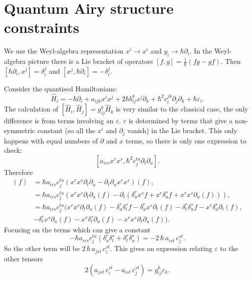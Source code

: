  \section{Quantum Airy structure constraints}
 \label{appendix:quantum_airy}
    We use the Weyl-algebra representation \(x^i \rightarrow x^i \) and \( y_i \rightarrow \hbar \partial_i \). In the Weyl-algebra picture there is a Lie bracket of operators \( [f,g] = \frac{1}{\hbar} \left( f g - g f \right) \). Then \( [ \hbar \partial_i , x^j ] = \delta_i^j \) and \( [ x^j, \hbar \partial_i ] = - \delta_i^j \).
    
    Consider the quantised Hamiltonians:
    \[ \widehat{H}_i = -\hbar \partial_i + a_{ijk} x^i x^j + 2 \hbar b_{ij}^k x^j \partial_k + \hbar^2 c_i^{jk} \partial_j \partial_k + \hbar \varepsilon_i. \]
    The calculation of \( [\widehat{H}_i,\widehat{H}_j]= g_{ij}^k \widehat{H}_k\) is very similar to the classical case, the only difference is from terms involving an \( \varepsilon \). \( \varepsilon \) is determined by terms that give a non-symmetric constant (so all the \(x^i\) and \( \partial_j\) vanish) in the Lie bracket. This only happens with equal numbers of \( \partial \) and \( x\) terms, so there is only one expression to check:
    \[  [ a_{irs} x^r x^s ,   \hbar^2 c_j^{tu} \partial_t \partial_u ]. \]
    Therefore
    \begin{align*}
          [ a_{irs} x^r x^s ,   \hbar^2 c_j^{tu} \partial_t \partial_u ] (f) &=  \hbar a_{irs} c_j^{tu} \left( x^r x^s \partial_t \partial_u - \partial_t \partial_u x^r x^s \right)(f), \\
                                                                             &= \hbar a_{irs} c_j^{tu} \left( x^r x^s \partial_t \partial_u (f) - \partial_t ( \delta_u^r x^s f + x^r \delta_u^s f + x^r x^s \partial_u (f)  ) \right),\\
                                                                            &= \hbar a_{irs} c_j^{tu} \big( x^r x^s \partial_t \partial_u (f) - \delta_u^r \delta_t^s f - \delta_u^r x^s \partial_t (f)  - \delta^r_t \delta_u^s f - x^r \delta_u^s \partial_t(f), \\
                                                                            &- \delta_t^r x^s \partial_u (f)  - x^r \delta^s_t \partial_u (f) - x^r x^s \partial_t \partial_u (f) \big).
    \end{align*}
    Focusing on the terms which can give a constant 
    \[ -\hbar  a_{irs} c_j^{tu} \left( \delta_u^r \delta_t^s  + \delta^r_t \delta_u^s \right) = -2 \, \hbar \,  a_{ist} \, c_j^{st}. \]
    So the other term will be \( 2 \, \hbar \,  a_{jst} \, c_i^{st} \). This gives an expression relating \( \varepsilon\) to the other tensors
    \[ 2 \left( a_{jst} \, c_i^{st} - a_{ist} \, c_j^{st} \right) = g_{ij}^k \varepsilon_k. \]